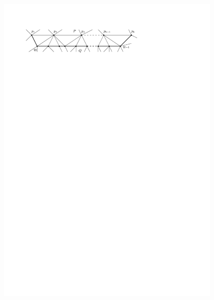     \begin{figure}[h]
      \centering
      \includegraphics[scale=1]{unifiedAlgo/img/rightNeighbourwalk/neighborPath.pdf}
      \caption{}
      \label{fig:right:neighborPath}
    \end{figure}


